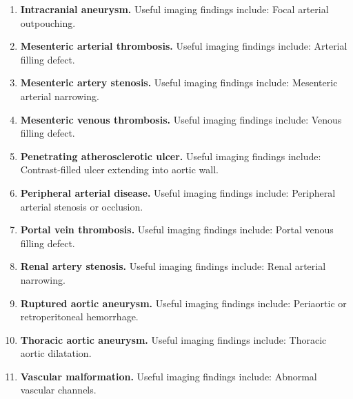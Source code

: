 \begin{enumerate}[leftmargin=*,itemsep=0.45em,topsep=0.4em]
\item \textbf{Intracranial aneurysm.} Useful imaging findings include: Focal arterial outpouching.
\item \textbf{Mesenteric arterial thrombosis.} Useful imaging findings include: Arterial filling defect.
\item \textbf{Mesenteric artery stenosis.} Useful imaging findings include: Mesenteric arterial narrowing.
\item \textbf{Mesenteric venous thrombosis.} Useful imaging findings include: Venous filling defect.
\item \textbf{Penetrating atherosclerotic ulcer.} Useful imaging findings include: Contrast-filled ulcer extending into aortic wall.
\item \textbf{Peripheral arterial disease.} Useful imaging findings include: Peripheral arterial stenosis or occlusion.
\item \textbf{Portal vein thrombosis.} Useful imaging findings include: Portal venous filling defect.
\item \textbf{Renal artery stenosis.} Useful imaging findings include: Renal arterial narrowing.
\item \textbf{Ruptured aortic aneurysm.} Useful imaging findings include: Periaortic or retroperitoneal hemorrhage.
\item \textbf{Thoracic aortic aneurysm.} Useful imaging findings include: Thoracic aortic dilatation.
\item \textbf{Vascular malformation.} Useful imaging findings include: Abnormal vascular channels.
\end{enumerate}

